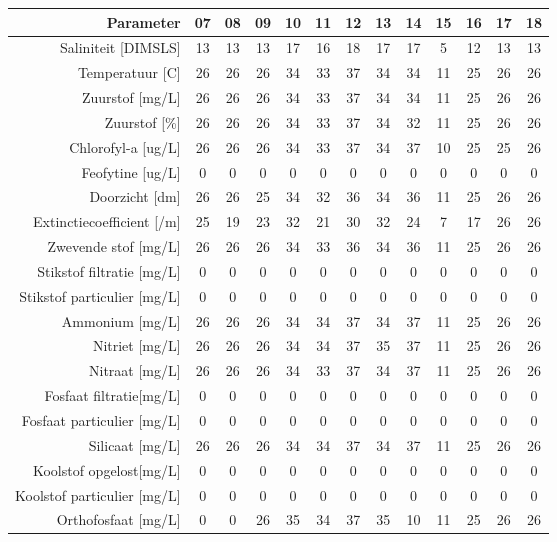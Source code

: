 \begin{tabular}{ r |c | c | c | c | c |c | c | c | c | c | c | c } 
\rowcolor[HTML]{EFEFEF}  
 Parameter & 07 & 08 & 09 & 10 & 11 & 12 & 13 & 14 & 15 & 16 & 17 & 18 \\    \hline     
Saliniteit [DIMSLS] &13 & 13 & 13 & 17 & 16 & 18 & 17 & 17 & 5 & 12 & 13 & 13 \\
Temperatuur [C] &26 & 26 & 26 & 34 & 33 & 37 & 34 & 34 & 11 & 25 & 26 & 26 \\
Zuurstof [mg/L] &26 & 26 & 26 & 34 & 33 & 37 & 34 & 34 & 11 & 25 & 26 & 26 \\
Zuurstof [\%] &26 & 26 & 26 & 34 & 33 & 37 & 34 & 32 & 11 & 25 & 26 & 26 \\
Chlorofyl-a [ug/L] &26 & 26 & 26 & 34 & 33 & 37 & 34 & 37 & 10 & 25 & 25 & 26 \\
Feofytine [ug/L] &0 & 0 & 0 & 0 & 0 & 0 & 0 & 0 & 0 & 0 & 0 & 0 \\
Doorzicht [dm] &26 & 26 & 25 & 34 & 32 & 36 & 34 & 36 & 11 & 25 & 26 & 26 \\
Extinctiecoefficient [/m] &25 & 19 & 23 & 32 & 21 & 30 & 32 & 24 & 7 & 17 & 26 & 26 \\
Zwevende stof [mg/L] &26 & 26 & 26 & 34 & 33 & 36 & 34 & 36 & 11 & 25 & 26 & 26 \\
Stikstof filtratie [mg/L] &0 & 0 & 0 & 0 & 0 & 0 & 0 & 0 & 0 & 0 & 0 & 0 \\
Stikstof particulier [mg/L] &0 & 0 & 0 & 0 & 0 & 0 & 0 & 0 & 0 & 0 & 0 & 0 \\
Ammonium [mg/L] &26 & 26 & 26 & 34 & 34 & 37 & 34 & 37 & 11 & 25 & 26 & 26 \\
Nitriet [mg/L] &26 & 26 & 26 & 34 & 34 & 37 & 35 & 37 & 11 & 25 & 26 & 26 \\
Nitraat [mg/L] &26 & 26 & 26 & 34 & 33 & 37 & 34 & 37 & 11 & 25 & 26 & 26 \\
Fosfaat filtratie[mg/L] &0 & 0 & 0 & 0 & 0 & 0 & 0 & 0 & 0 & 0 & 0 & 0 \\
Fosfaat particulier [mg/L] &0 & 0 & 0 & 0 & 0 & 0 & 0 & 0 & 0 & 0 & 0 & 0 \\
Silicaat [mg/L] &26 & 26 & 26 & 34 & 34 & 37 & 34 & 37 & 11 & 25 & 26 & 26 \\
Koolstof opgelost[mg/L] &0 & 0 & 0 & 0 & 0 & 0 & 0 & 0 & 0 & 0 & 0 & 0 \\
Koolstof particulier [mg/L] &0 & 0 & 0 & 0 & 0 & 0 & 0 & 0 & 0 & 0 & 0 & 0 \\
Orthofosfaat [mg/L] &0 & 0 & 26 & 35 & 34 & 37 & 35 & 10 & 11 & 25 & 26 & 26 \\

\end{tabular}
